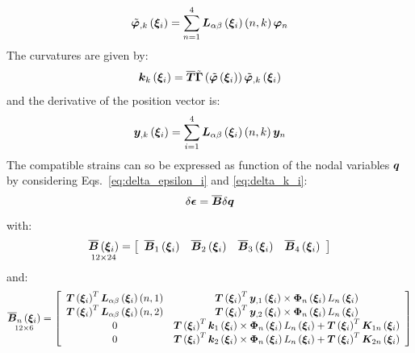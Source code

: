 \begin{equation}
\tilde{ \T{ \varphi } }_{,k} \valxii  =
\sum_{n=1}^4 \TT{L}_{\alpha \beta} \valxii \plbr{ n, k } \T{\varphi}_{n}
\end{equation}
The curvatures are given by:
\begin{equation}
\T{k}_{k} \valxii  =
\overline{\TT{T}} \tilde{\TT{\Gamma}} \plbr{ \tilde{\T{\varphi}} \valxii } \tilde{ \T{\varphi} }_{,k} \valxii
\end{equation}
and the derivative of the position vector is:
\begin{equation}
\T{y}_{,k} \valxii  =
\sum_{i=1}^{4} \TT{L}_{\alpha \beta} \valxii \plbr{n,k} \T{y}_n
\end{equation}
The compatible strains can so be expressed as function of the nodal variables $\T{q}$ by considering Eqs.~\ref{eq:delta_epsilon_i} and \ref{eq:delta_k_i}:
\begin{equation}
\delta \T{\epsilon} = \overline{\TT{B}} \delta{\T{q}}
\end{equation}
with:
\begin{equation}
\underset{ 12 \times 24 }{\overline{\TT{B}} \valxii} =
\sqbr{ \matr{ c c c c  }{
\overline{\TT{B}}_1 \valxii & \overline{\TT{B}}_2 \valxii & \overline{\TT{B}}_3 \valxii & \overline{\TT{B}}_4 \valxii
}}
\label{eq:B_overline}
\end{equation}
and:
\begin{equation}
\underset{ 12 \times 6 }{\overline{\TT{B}}_n \valxii} =
\sqbr{ \matr{ c c  }{
\TT{T} \valxii^T \TT{L}_{\alpha \beta} \valxii \plbr{n,1} & \TT{T}\valxii^T \T{y}_{,1} \valxii \times \TT{\Phi}_{n} \valxii L_{n} \valxii \\
\TT{T} \valxii^T \TT{L}_{\alpha \beta} \valxii \plbr{n,2} & \TT{T}\valxii^T \T{y}_{,2} \valxii \times \TT{\Phi}_{n} \valxii L_{n} \valxii \\
0 & \TT{T}\valxii^T \T{k}_{1} \valxii \times \TT{\Phi}_{n} \valxii L_{n} \valxii + \TT{T} \valxii^T \TT{K}_{1n} \valxii \\
0 & \TT{T}\valxii^T \T{k}_{2} \valxii \times \TT{\Phi}_{n} \valxii L_{n} \valxii + \TT{T} \valxii^T \TT{K}_{2n} \valxii
}}
\end{equation}
